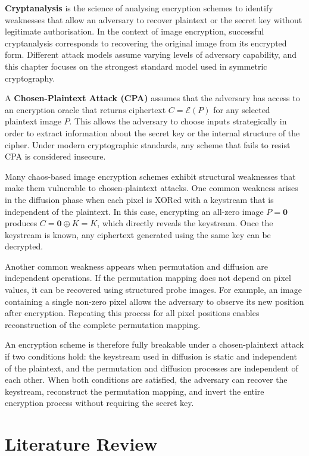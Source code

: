 \textbf{Cryptanalysis} is the science of analysing encryption schemes to identify weaknesses that allow an adversary to recover plaintext or the secret key without legitimate authorisation. In the context of image encryption, successful cryptanalysis corresponds to recovering the original image from its encrypted form. Different attack models assume varying levels of adversary capability, and this chapter focuses on the strongest standard model used in symmetric cryptography.

A \textbf{Chosen-Plaintext Attack (CPA)} assumes that the adversary has access to an encryption oracle that returns ciphertext $C = \mathcal{E}(P)$ for any selected plaintext image $P$. This allows the adversary to choose inputs strategically in order to extract information about the secret key or the internal structure of the cipher. Under modern cryptographic standards, any scheme that fails to resist CPA is considered insecure.

Many chaos-based image encryption schemes exhibit structural weaknesses that make them vulnerable to chosen-plaintext attacks. One common weakness arises in the diffusion phase when each pixel is XORed with a keystream that is independent of the plaintext. In this case, encrypting an all-zero image $P = \mathbf{0}$ produces $C = \mathbf{0} \oplus K = K$, which directly reveals the keystream. Once the keystream is known, any ciphertext generated using the same key can be decrypted.

Another common weakness appears when permutation and diffusion are independent operations. If the permutation mapping does not depend on pixel values, it can be recovered using structured probe images. For example, an image containing a single non-zero pixel allows the adversary to observe its new position after encryption. Repeating this process for all pixel positions enables reconstruction of the complete permutation mapping.

An encryption scheme is therefore fully breakable under a chosen-plaintext attack if two conditions hold: the keystream used in diffusion is static and independent of the plaintext, and the permutation and diffusion processes are independent of each other. When both conditions are satisfied, the adversary can recover the keystream, reconstruct the permutation mapping, and invert the entire encryption process without requiring the secret key.

\section{Literature Review}


